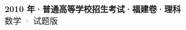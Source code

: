 \documentclass[zihao=-4, a4paper]{ctexart}
\begin{document}
\begin{center}
  {\Large\bfseries 2010 年·普通高等学校招生考试·福建卷·理科}\\[4pt]
  {\large 数学 · 试题版}
\end{center}
\medskip
{}

\end{document}

